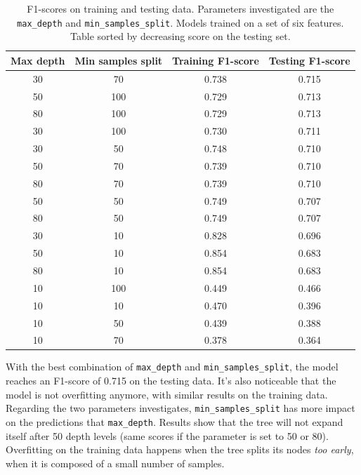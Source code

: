 \begin{table}[htbp]
    \centering
    \begin{tabular}{c|c|c|c}
    \textbf{Max depth} & \textbf{Min samples split} & \textbf{Training F1-score} & \textbf{Testing F1-score} \\ \hline
    30	&  70   &  	0.738  &  0.715 \\
    50	&  100  &  	0.729  &  0.713 \\
    80	&  100  &  	0.729  &  0.713 \\
    30	&  100  &  	0.730  &  0.711 \\
    30	&  50   &  	0.748  &  0.710 \\
    50	&  70   &  	0.739  &  0.710 \\
    80	&  70   &  	0.739  &  0.710 \\
    50	&  50   &  	0.749  &  0.707 \\
    80	&  50   &  	0.749  &  0.707 \\
    30	&  10   &  	0.828  &  0.696 \\
    50	&  10   &  	0.854  &  0.683 \\
    80	&  10   &  	0.854  &  0.683 \\
    10	&  100  &  	0.449  &  0.466 \\
    10	&  10   &  	0.470  &  0.396 \\
    10	&  50   &  	0.439  &  0.388 \\
    10	&  70   &  	0.378  &  0.364 
    \end{tabular}
    \caption[F1-scores for ExtraTree hyperparameters optimization]{F1-scores on training and testing data. Parameters investigated are the \texttt{max\_depth} and \texttt{min\_samples\_split}. Models trained on a set of six features. Table sorted by decreasing score on the testing set.}
    \label{tab:tree-fine-tune}
\end{table}

With the best combination of \texttt{max\_depth} and \texttt{min\_samples\_split}, the model reaches an F1-score of 0.715 on the testing data. It's also noticeable that the model is not overfitting anymore, with similar results on the training data. Regarding the two parameters investigates, \texttt{min\_samples\_split} has more impact on the predictions that \texttt{max\_depth}. Results show that the tree will not expand itself after 50 depth levels (same scores if the parameter is set to 50 or 80). Overfitting on the training data happens when the tree splits its nodes \textit{too early}, when it is composed of a small number of samples.



